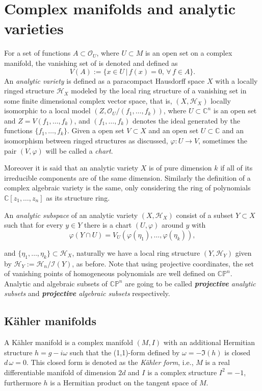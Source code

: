 \documentclass[12pt,twoside,a4paper]{report}
\newcommand{\co}{\ensuremath{\mathbb C }}
\newcommand{\con}{\ensuremath{\mathbb{C}^n}}
\newcommand{\cp}{\ensuremath{\mathbb{CP}}}
\begin{document}
\section{Complex manifolds and analytic varieties}
For a set of functions $A\subset\mathcal{O}_{U}$, where $U\subset M$ is an open set on a complex manifold, the vanishing set of is denoted and defined as
\[
  V(A):=\{x\in U\,\vert\,f(x)=0,\,\forall\,f\in A\}.
\]
An \emph{analytic variety} is defined as a paracompact Hausdorff space $X$ with a locally ringed structure $\mathcal{H}_{X}$ modeled by the local ring structure of a vanishing set in some finite dimensional complex vector space, that is, $(X,\mathcal{H}_{X})$ locally isomorphic to a local model $(Z,\mathcal{O}_{U}/(f_{1},\dots,f_{k}))$, where $U\subset\con$ is an open set and $Z=V(f_{1},\dots,f_{k})$, and $(f_{1},\dots,f_{k})$ denotes the ideal generated by the functions $\{f_{1},\dots,f_{k}\}$. Given a open set $V\subset X$ and an open set $U\subset\co$ and an isomorphism between ringed structures as discussed, $\varphi:U\rightarrow V$, sometimes the pair $(V,\varphi)$ will be called a \emph{chart}.

Moreover it is said that an analytic variety $X$ is of pure dimension $k$ if all of its irreducible components are of the same dimension. Similarly the definition of a complex algebraic variety is the same, only considering the ring of polynomials $\co[z_{1},\dots,z_{n}]$ as its structure ring.

An \emph{analytic subspace} of an analytic variety $(X,\mathcal{H}_{X})$ consist of a subset $Y\subset X$ such that for every $y\in Y$ there is a chart $(U,\varphi)$ around $y$ with
\[
  \varphi(Y\cap U)=V_U(\varphi(\eta_1),\dots,\varphi(\eta_k)),
\]

\noindent and $\lbrace\eta_1,\dots,\eta_k\rbrace\subset\mathcal{H}_{X}$, naturally we have a local ring structure $(Y,\mathcal{H}_{Y})$ given by $\mathcal{H}_Y:=\mathcal{H}_n/\mathcal{I}(Y)$, as before.
Note that using projective coordinates, the set of vanishing points of homogeneous polynomials are well defined on $\cp^n$. Analytic and algebraic subsets of $\cp^n$ are going to be called  \emph{\textbf{projective} analytic subsets} and \emph{\textbf{projective} algebraic subsets} respectively.

\subsection{Kähler manifolds}
A K\"ahler manifold is a complex manifold $(M,I)$ with an additional Hermitian structure $h=g-i\omega$ such that the (1,1)-form defined by $\omega=-\Im (h)$ is closed $d\,\omega=0$. This closed form is denoted as the \emph{K\"ahler form}, i.e., $M$ is a real differentiable manifold of dimension $2d$ and $I$ is a complex structure $I^2=-1$, furthermore $h$ is a Hermitian product on the tangent space of $M$.
\end{document}
